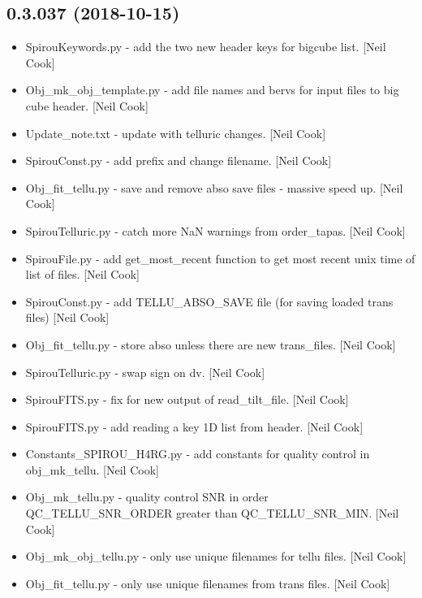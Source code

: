 \documentclass[a4paper,10pt,english]{report}
\begin{document}
\subsection{0.3.037 (2018-10-15)}
\label{\detokenize{misc/changelog:id293}}\begin{itemize}
\item {} 
SpirouKeywords.py - add the two new header keys for bigcube list.
{[}Neil Cook{]}

\item {} 
Obj\_mk\_obj\_template.py - add file names and bervs for input files to
big cube header. {[}Neil Cook{]}

\item {} 
Update\_note.txt - update with telluric changes. {[}Neil Cook{]}

\item {} 
SpirouConst.py - add prefix and change filename. {[}Neil Cook{]}

\item {} 
Obj\_fit\_tellu.py - save and remove abso save files - massive speed up.
{[}Neil Cook{]}

\item {} 
SpirouTelluric.py - catch more NaN warnings from order\_tapas. {[}Neil
Cook{]}

\item {} 
SpirouFile.py - add get\_most\_recent function to get most recent unix
time of list of files. {[}Neil Cook{]}

\item {} 
SpirouConst.py - add TELLU\_ABSO\_SAVE file (for saving loaded trans
files) {[}Neil Cook{]}

\item {} 
Obj\_fit\_tellu.py - store abso unless there are new trans\_files. {[}Neil
Cook{]}

\item {} 
SpirouTelluric.py - swap sign on dv. {[}Neil Cook{]}

\item {} 
SpirouFITS.py - fix for new output of read\_tilt\_file. {[}Neil Cook{]}

\item {} 
SpirouFITS.py - add reading a key 1D list from header. {[}Neil Cook{]}

\item {} 
Constants\_SPIROU\_H4RG.py - add constants for quality control in
obj\_mk\_tellu. {[}Neil Cook{]}

\item {} 
Obj\_mk\_tellu.py - quality control SNR in order QC\_TELLU\_SNR\_ORDER
greater than QC\_TELLU\_SNR\_MIN. {[}Neil Cook{]}

\item {} 
Obj\_mk\_obj\_tellu.py - only use unique filenames for tellu files. {[}Neil
Cook{]}

\item {} 
Obj\_fit\_tellu.py - only use unique filenames from trans files. {[}Neil
Cook{]}

\end{itemize}
\end{document}
